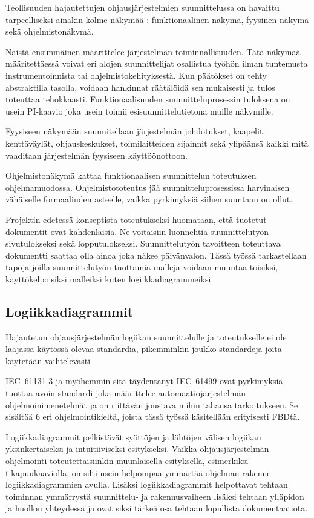 \documentclass[finnish,12pt]{article}
\begin{document}
Teollisuuden hajautettujen ohjausjärjestelmien suunnittelussa on havaittu
tarpeelliseksi ainakin kolme näkymää \cite{RefWorks:38}: funktionaalinen näkymä,
fyysinen näkymä sekä ohjelmistonäkymä.

Näistä ensimmäinen määrittelee järjestelmän toiminnallisuuden. Tätä näkymää
määritettäessä voivat eri alojen suunnittelijat osallistua työhön ilman
tuntemusta instrumentoinnista tai ohjelmistokehityksestä. Kun päätökset on tehty
abstraktilla tasolla, voidaan hankinnat räätälöidä sen mukaisesti ja tulos
toteuttaa tehokkaasti. Funktionaalisuuden suunnitteluprosessin tuloksena on usein
PI-kaavio joka usein toimii esisuunnittelutietona muille näkymille.

Fyysiseen näkymään suunnitellaan järjestelmän johdotukset, kaapelit, kenttäväylät,
ohjauskeskukset, toimilaitteiden sijainnit sekä ylipäänsä kaikki mitä vaaditaan järjestelmän fyysiseen käyttöönottoon.

Ohjelmistonäkymä kattaa funktionaalisen suunnittelun toteutuksen ohjelmamuodossa.
Ohjelmistototeutus jää suunnitteluprosessissa harvinaisen vähäiselle formaaliuden asteelle, vaikka pyrkimyksiä siihen suuntaan on ollut.

Projektin edetessä konseptista toteutukseksi huomataan, että tuotetut dokumentit ovat kahdenlaisia.
Ne voitaisiin luonnehtia suunnittelutyön sivutulokseksi sekä lopputulokseksi.
Suunnittelutyön tavoitteen toteuttava dokumentti saattaa olla ainoa joka näkee päivänvalon.
Tässä työssä tarkastellaan tapoja joilla suunnittelutyön tuottamia malleja voidaan muuntaa
toisiksi, käyttökelpoisiksi malleiksi kuten logiikkadiagrammeiksi.

	\subsection{Logiikkadiagrammit}

Hajautetun ohjausjärjestelmän logiikan suunnittelulle ja toteutukselle ei ole
laajassa käytössä olevaa standardia, pikemminkin joukko standardeja joita
käytetään vaihtelevasti

IEC~61131-3 ja myöhemmin sitä täydentänyt IEC~61499 ovat pyrkimyksiä tuottaa
avoin standardi joka määrittelee automaatiojärjestelmän ohjelmoinimenetelmät ja
on riittävän joustava mihin tahansa tarkoitukseen. Se sisältää 6 eri
ohjelmointikieltä, joista tässä työssä käsitellään erityisesti FBDtä.

Logiikkadiagrammit pelkistävät syöttöjen ja lähtöjen välisen logiikan
yksinkertaiseksi ja intuitiiviseksi esitykseksi. Vaikka ohjausjärjestelmän
ohjelmointi toteutettaisiinkin muunlaisella esityksellä, esimerkiksi
tikapuukaaviolla, on silti usein helpompaa ymmärtää ohjelman rakenne
logiikkadiagrammien avulla. Lisäksi logiikkadiagrammit helpottavat tehtaan
toiminnan ymmärrystä suunnittelu- ja rakennusvaiheen lisäksi tehtaan ylläpidon
ja huollon yhteydessä ja ovat siksi tärkeä osa tehtaan lopullista
dokumentaatiota.
\end{document}
